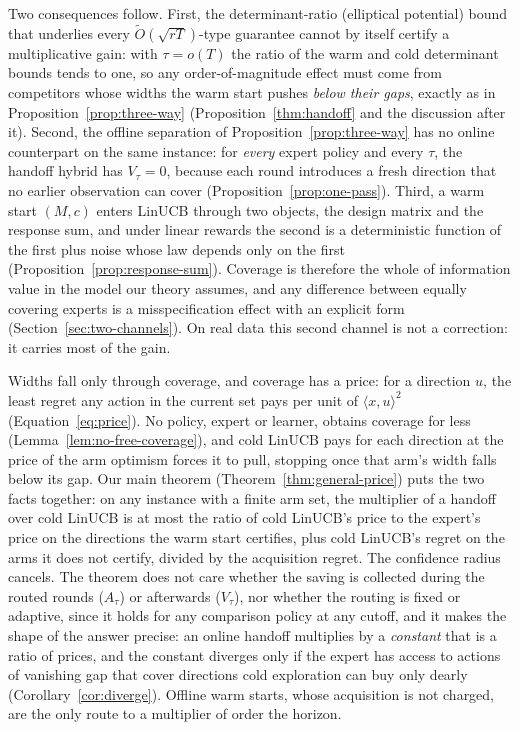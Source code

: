 \documentclass{article}
\theoremstyle{definition}
\theoremstyle{remark}
\theoremstyle{remark}
\begin{document}
Two consequences follow. First, the determinant-ratio (elliptical potential)
bound that underlies every $\widetilde O(\sqrt{rT})$-type guarantee cannot by
itself certify a multiplicative gain: with $\tau=o(T)$ the ratio of the warm
and cold determinant bounds tends to one, so any order-of-magnitude effect must
come from competitors whose widths the warm start pushes \emph{below their
gaps}, exactly as in Proposition~\ref{prop:three-way}
(Proposition~\ref{thm:handoff} and the discussion after it). Second, the offline
separation of Proposition~\ref{prop:three-way} has no online counterpart on
the same instance: for \emph{every} expert policy and every $\tau$, the
handoff hybrid has $V_\tau=0$, because each round introduces a fresh direction
that no earlier observation can cover (Proposition~\ref{prop:one-pass}).
Third, a warm start $(M,c)$ enters LinUCB through two objects, the design
matrix and the response sum, and under linear rewards the second is a
deterministic function of the first plus noise whose law depends only on the
first (Proposition~\ref{prop:response-sum}). Coverage is therefore the whole
of information value in the model our theory assumes, and any difference
between equally covering experts is a misspecification effect with an explicit
form (Section~\ref{sec:two-channels}). On real data this second channel is not
a correction: it carries most of the gain.

Widths fall only through coverage, and coverage has a price: for a direction
$u$, the least regret any action in the current set pays per unit of
$\langle x,u\rangle^2$ (Equation~\eqref{eq:price}). No policy, expert or
learner, obtains coverage for less (Lemma~\ref{lem:no-free-coverage}), and
cold LinUCB pays for each direction at the price of the arm optimism forces it
to pull, stopping once that arm's width falls below its gap. Our main theorem
(Theorem~\ref{thm:general-price}) puts the two facts together: on any
instance with a finite arm set, the multiplier of a handoff over cold LinUCB
is at most the ratio of cold LinUCB's price to the expert's price on the
directions the warm start certifies, plus cold LinUCB's regret on the arms
it does not certify, divided by the acquisition regret. The confidence radius
cancels. The theorem does not care whether the saving is collected during
the routed rounds ($A_\tau$) or afterwards ($V_\tau$), nor whether the
routing is fixed or adaptive, since it holds for any comparison policy at
any cutoff, and it makes the shape of the answer precise: an online handoff multiplies by a
\emph{constant} that is a ratio of prices, and the constant diverges only
if the expert has access to actions of vanishing gap that cover directions
cold exploration can buy only dearly (Corollary~\ref{cor:diverge}). Offline
warm starts, whose acquisition is not charged, are the only route to a
multiplier of order the horizon.
\end{document}
